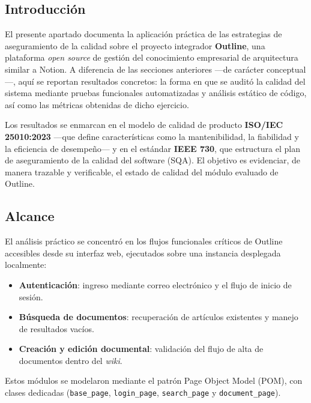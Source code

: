 \documentclass[11pt,letterpaper]{article}
\begin{document}
\subsection*{Introducci\'on}

El presente apartado documenta la aplicaci\'on pr\'actica de las estrategias de
aseguramiento de la calidad sobre el proyecto integrador \textbf{Outline}, una
plataforma \textit{open source} de gesti\'on del conocimiento empresarial de
arquitectura similar a Notion. A diferencia de las secciones anteriores ---de
car\'acter conceptual---, aqu\'i se reportan resultados concretos: la forma en
que se audit\'o la calidad del sistema mediante pruebas funcionales
automatizadas y an\'alisis est\'atico de c\'odigo, as\'i como las m\'etricas
obtenidas de dicho ejercicio.

Los resultados se enmarcan en el modelo de calidad de producto
\textbf{ISO/IEC 25010:2023} ---que define caracter\'isticas como la
mantenibilidad, la fiabilidad y la eficiencia de desempe\~no--- y en el
est\'andar \textbf{IEEE 730}, que estructura el plan de aseguramiento de la
calidad del software (SQA). El objetivo es evidenciar, de manera trazable y
verificable, el estado de calidad del m\'odulo evaluado de Outline.

\subsection*{Alcance}

El an\'alisis pr\'actico se concentr\'o en los flujos funcionales cr\'iticos de
Outline accesibles desde su interfaz web, ejecutados sobre una instancia
desplegada localmente:

\begin{itemize}
  \item \textbf{Autenticaci\'on}: ingreso mediante correo electr\'onico y el
        flujo de inicio de sesi\'on.
  \item \textbf{B\'usqueda de documentos}: recuperaci\'on de art\'iculos
        existentes y manejo de resultados vac\'ios.
  \item \textbf{Creaci\'on y edici\'on documental}: validaci\'on del flujo de
        alta de documentos dentro del \textit{wiki}.
\end{itemize}

Estos m\'odulos se modelaron mediante el patr\'on Page Object Model (POM), con
clases dedicadas (\texttt{base\_page}, \texttt{login\_page},
\texttt{search\_page} y \texttt{document\_page}).
\end{document}

